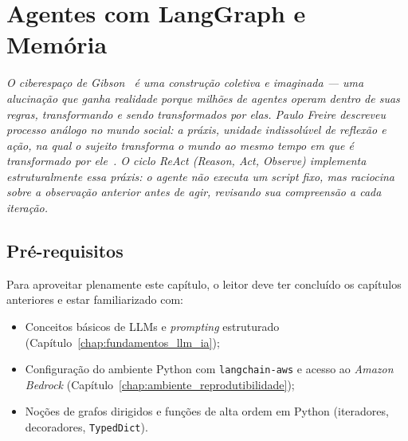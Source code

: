 \chapter{Agentes com LangGraph e Mem\'oria}
\label{chap:agentes_langgraph_memoria}

{\small\itshape\color{AccentGray}
O ciberespa\c{c}o de Gibson~\cite{gibson1984neuromancer} \'{e} uma constru\c{c}\~{a}o coletiva e imaginada --- uma alucina\c{c}\~{a}o que ganha realidade porque milh\~{o}es de agentes operam dentro de suas regras, transformando e sendo transformados por elas. Paulo Freire descreveu processo an\'{a}logo no mundo social: a pr\'{a}xis, unidade indissol\'{u}vel de reflex\~{a}o e a\c{c}\~{a}o, na qual o sujeito transforma o mundo ao mesmo tempo em que \'{e} transformado por ele~\cite{freire1968pedagogia}. O ciclo ReAct \textit{(Reason, Act, Observe)} implementa estruturalmente essa pr\'{a}xis: o agente n\~{a}o executa um \textit{script} fixo, mas raciocina sobre a observa\c{c}\~{a}o anterior antes de agir, revisando sua compreens\~{a}o a cada itera\c{c}\~{a}o.\par}
\vspace{0.6em}
\section{Pr\'e-requisitos}

Para aproveitar plenamente este cap\'itulo, o leitor deve ter
conclu\'ido os cap\'itulos anteriores e estar familiarizado com:

\begin{itemize}[leftmargin=*]
  \item Conceitos b\'asicos de LLMs e \textit{prompting} estruturado
        (Cap\'itulo~\ref{chap:fundamentos_llm_ia});
  \item Configura\c{c}\~ao do ambiente Python com \texttt{langchain-aws}
        e acesso ao \textit{Amazon Bedrock}
        (Cap\'itulo~\ref{chap:ambiente_reprodutibilidade});
  \item No\c{c}\~oes de grafos dirigidos e fun\c{c}\~oes de alta ordem
        em Python (iteradores, decoradores, \texttt{TypedDict}).
\end{itemize}

